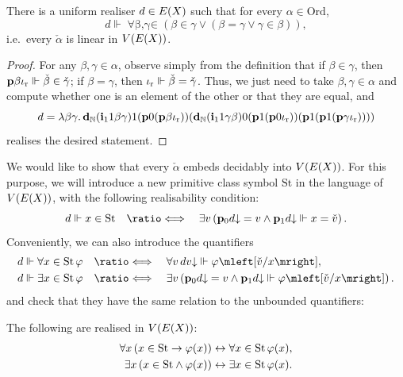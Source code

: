 \documentclass[12pt,openany]{book}
\theoremstyle{plain}
\theoremstyle{definition}
\newcommand\opA[1]{\mathop{\forall #1}}
\newcommand\opE[1]{\mathop{\exists #1}}
\newcommand\oplam[1]{\mathop{\lambda #1.}}
\newcommand\defeqv{\quad \ratio\Longleftrightarrow \quad}
\newcommand\CZF{\mathrm{CZF}}
\newcommand\REM{\mathrm{REM}}
\newcommand\Ord{\mathrm{Ord}}
\newcommand\bp{\mathbf{p}}
\newcommand\bdN{\mathbf{d}_\mathbb{N}}
\newcommand\bi{\mathbf{i}}
\newcommand\ior{\iota_\textup{r}}
\newcommand\St{\mathrm{St}}
\begin{document}
\begin{lemma}[$\CZF^- + \REM$]
  \label{lem:e-rec-real-check-ord-lin}
  There is a uniform realiser $d \in E\mleft(X\mright)$ such that for every $\alpha \in \Ord$,
  \[d \Vdash \opA{\beta, \gamma \in \check{\alpha}} \left(\beta \in \gamma \lor \left(\beta = \gamma \lor \gamma \in \beta\right)\right),\]
  i.e.\ every $\check{\alpha}$ is linear in $V\mleft(E\mleft(X\mright)\mright)$.
\end{lemma}

\begin{proof}
  For any $\beta, \gamma \in \alpha$, observe simply from the definition that if $\beta \in \gamma$, then $\bp \beta \ior \Vdash \check{\beta} \in \check{\gamma}$; if $\beta = \gamma$, then $\ior \Vdash \check{\beta} = \check{\gamma}$. Thus, we just need to take $\beta, \gamma \in \alpha$ and compute whether one is an element of the other or that they are equal, and
  \[d = \oplam{\beta \gamma} \bdN \mleft(\bi_1 1 \beta \gamma\mright) 1 \mleft(\bp 0 \mleft(\bp \beta \ior\mright)\mright) \mleft(\bdN \mleft(\bi_1 1 \gamma \beta\mright) 0 \mleft(\bp 1 \mleft(\bp 0 \ior\mright)\mright) \mleft(\bp 1 \mleft(\bp 1 \mleft(\bp \gamma \ior\mright)\mright)\mright)\mright)\]
  realises the desired statement.
\end{proof}

We would like to show that every $\check{\alpha}$ embeds decidably into $V\mleft(E\mleft(X\mright)\mright)$. For this purpose, we will introduce a new primitive class symbol $\St$ in the language of $V\mleft(E\mleft(X\mright)\mright)$, with the following realisability condition:
\[d \Vdash x \in \St \defeqv \opE{v} \left(\bp_0 d {\downarrow} = v \land \bp_1 d {\downarrow} \Vdash x = \check{v}\right).\]
Conveniently, we can also introduce the quantifiers
\begin{align*}
  d \Vdash \opA{x \in \St} \varphi & \defeqv \opA{v} dv {\downarrow} \Vdash \varphi\mleft[\check{v}/x\mright],                                                  \\
  d \Vdash \opE{x \in \St} \varphi & \defeqv \opE{v} \left(\bp_0 d {\downarrow} = v \land \bp_1 d {\downarrow} \Vdash \varphi\mleft[\check{v}/x\mright]\right).
\end{align*}
and check that they have the same relation to the unbounded quantifiers:
\begin{lemma}
  The following are realised in $V\mleft(E\mleft(X\mright)\mright)$:
  \begin{align*}
    \opA{x} \left(x \in \St \rightarrow \varphi\mleft(x\mright)\right) & \leftrightarrow \opA{x \in \St} \varphi\mleft(x\mright), \\
    \opE{x} \left(x \in \St \land \varphi\mleft(x\mright)\right)       & \leftrightarrow \opE{x \in \St} \varphi\mleft(x\mright).
  \end{align*}
\end{lemma}
\end{document}
